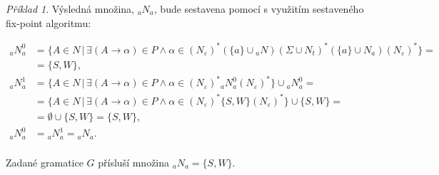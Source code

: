 \documentclass[a4paper, 12pt]{article}
\theoremstyle{definition}
\theoremstyle{definition}
\theoremstyle{definition}
\theoremstyle{remark}
\newtheorem{example}{Příklad}[section]
\begin{document}
\begin{example}
Výsledná množina, ${}_{a}N_{a}$, bude sestavena pomocí s využitím sestaveného fix-point algoritmu:

\begin{align*}
    {}_{a}N_{a}^0 &= \{A \in N \, | \, \exists (A \rightarrow \alpha) \in P \wedge \alpha \in (N_{\varepsilon})^\ast(\{a\} \cup {}_{a}N)(\Sigma \cup N_t)^\ast(\{a\} \cup N_a)(N_{\varepsilon})^\ast\} = \\
                  &= \{S, W\}, \\
    {}_{a}N_{a}^{1} &= \{A \in N \, | \, \exists (A \rightarrow \alpha) \in P \wedge \alpha \in (N_{\varepsilon})^\ast{}_{a}N_{a}^0(N_{\varepsilon})^\ast\} \cup {}_{a}N_{a}^0 =  \\
                    &= \{A \in N \, | \, \exists (A \rightarrow \alpha) \in P \wedge \alpha \in (N_{\varepsilon})^\ast\{S, W\}(N_{\varepsilon})^\ast\} \cup \{S, W\} =  \\
                    &= \emptyset \cup \{S, W\} = \{S, W\}, \\
    {}_{a}N_{a}^0 &= {}_{a}N_{a}^1 = {}_{a}N_{a}. \\
\end{align*}

Zadané gramatice $G$ přísluší množina ${}_{a}N_{a} = \{S, W\}$.
\end{example}

\newpage


\renewcommand{\refname}{Použitá literatura}

\end{document}

